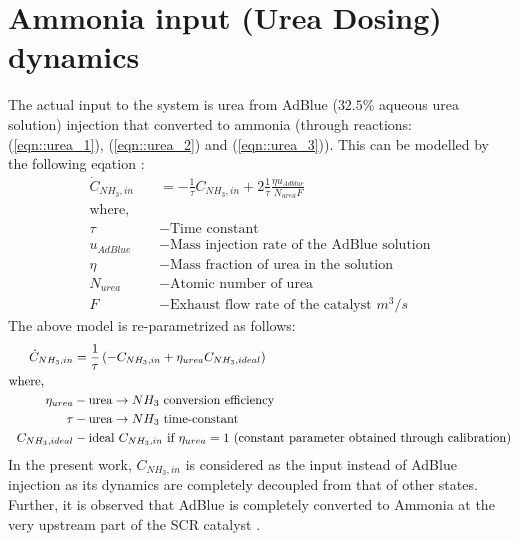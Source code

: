\section{Ammonia input (Urea Dosing) dynamics}
The actual input to the system is urea from AdBlue ($32.5\%$ aqueous urea
solution) injection that converted to ammonia (through reactions:
(\ref{eqn::urea_1}), (\ref{eqn::urea_2}) and (\ref{eqn::urea_3})). This can be modelled by the following eqation \cite{nova2014urea}:
\begin{align*}
    \dot C_{NH_3, in} &= - \frac{1}{\tau} C_{NH_3, in} + 2 \frac{1}{\tau} \frac{ \eta u_{Adblue}}{N_{urea} F}\\
    \text{where, } \quad &\\
    \tau &- \text{Time constant}\\
    u_{AdBlue} &- \text{Mass injection rate of the AdBlue solution}\\
    \eta &- \text{Mass fraction of urea in the solution}\\
    N_{urea} &- \text{Atomic number of urea}\\
    F &- \text{Exhaust flow rate of the catalyst } m^3/s
\end{align*}
The above model is re-parametrized as follows:
\begin{align*}
    \dot C_{NH_3, in} &= \frac{1}{\tau} \left(  -C_{NH_3, in} +\eta_{urea} C_{NH_3, ideal} \right) \\
    \text{where, }\qquad &\\
    \eta_{urea} &- \text{urea} \rightarrow NH_3 \text{ conversion efficiency}\\
    \tau &- \text{urea} \rightarrow NH_3 \text{ time-constant}\\
    C_{NH_3, ideal} &- \text{ideal $C_{NH_3, in}$ if $\eta_{urea} = 1$ (constant parameter obtained through calibration)}
\end{align*}
In the present work, $C_{NH_3, in}$ is considered as the input instead of AdBlue
injection as its dynamics are completely decoupled from that of other states.
Further, it is observed that AdBlue is completely converted to Ammonia at the
very upstream part of the SCR catalyst \cite{hsieh2011development}.
